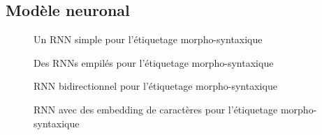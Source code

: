 \documentclass{KodeBook}
\begin{document}
\subsection{Modèle neuronal}

\begin{figure}
	\centering
	\caption{Un RNN simple pour l'étiquetage morpho-syntaxique \cite{2019-jurafsky-martin}}
\end{figure}

\begin{figure}
	\centering
	\caption{Des RNNs empilés pour l'étiquetage morpho-syntaxique \cite{2019-jurafsky-martin}}
\end{figure}

\begin{figure}
	\centering
	\caption{RNN bidirectionnel pour l'étiquetage morpho-syntaxique \cite{2019-jurafsky-martin}}
\end{figure}

\begin{figure}
	\centering
	\caption{RNN avec des embedding de caractères pour l'étiquetage morpho-syntaxique \cite{2019-jurafsky-martin}}
\end{figure}


\begin{discussion}



\end{discussion}

\ifx\wholebook\relax\else
% 
% 
	
\end{document}
